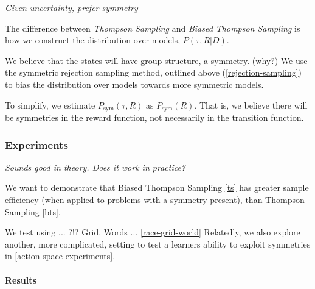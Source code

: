 \begin{displayquote}
\textsl{Given uncertainty, prefer symmetry}
\end{displayquote}

The difference between \textit{Thompson Sampling} and \textit{Biased Thompson Sampling}
is how we construct the distribution over models, $P(\tau, R |D)$.

We believe that the states will have group structure, a symmetry. ({\color{red}why?})
We use the symmetric rejection sampling method, outlined above (\ref{rejection-sampling}) to bias the
distribution over models towards more symmetric models.

To simplify, we estimate $P_{\text{sym}}(\tau, R)$ as $P_{\text{sym}}(R)$. That is, we believe there will be symmetries in the reward function, not necessarily in the transition function.

%
%

\subsubsection{Experiments}

\begin{displayquote}
	\textsl{Sounds good in theory. Does it work in practice?}
\end{displayquote}

We want to demonstrate that Biased Thompson Sampling \ref{ts} has greater sample efficiency (when applied to problems with a symmetry present), than Thompson Sampling \ref{bts}.

We test using ... ?!? Grid. Words ... \ref{race-grid-world}
Relatedly, we also explore another, more complicated, setting to test a learners ability to exploit symmetries in \ref{action-space-experiments}.

\paragraph{Results}

